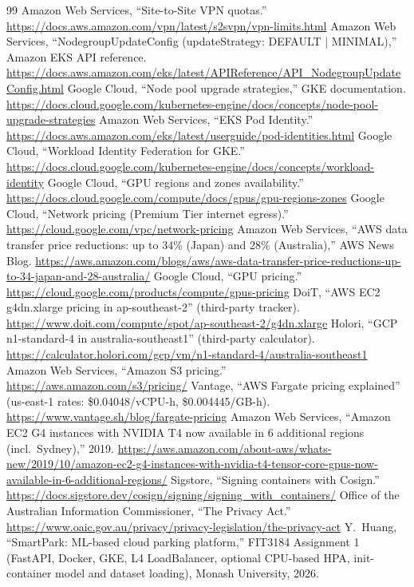 \documentclass[10pt,a4paper]{article}
\begin{document}
\begin{thebibliography}{99}
 Amazon Web Services, ``Site-to-Site VPN quotas.''
  \url{https://docs.aws.amazon.com/vpn/latest/s2svpn/vpn-limits.html}
 Amazon Web Services, ``NodegroupUpdateConfig (updateStrategy: DEFAULT | MINIMAL),'' Amazon EKS API reference.
  \url{https://docs.aws.amazon.com/eks/latest/APIReference/API_NodegroupUpdateConfig.html}
 Google Cloud, ``Node pool upgrade strategies,'' GKE documentation.
  \url{https://docs.cloud.google.com/kubernetes-engine/docs/concepts/node-pool-upgrade-strategies}
 Amazon Web Services, ``EKS Pod Identity.''
  \url{https://docs.aws.amazon.com/eks/latest/userguide/pod-identities.html}
 Google Cloud, ``Workload Identity Federation for GKE.''
  \url{https://docs.cloud.google.com/kubernetes-engine/docs/concepts/workload-identity}
 Google Cloud, ``GPU regions and zones availability.''
  \url{https://docs.cloud.google.com/compute/docs/gpus/gpu-regions-zones}
 Google Cloud, ``Network pricing (Premium Tier internet egress).''
  \url{https://cloud.google.com/vpc/network-pricing}
 Amazon Web Services, ``AWS data transfer price reductions: up to 34\% (Japan) and 28\% (Australia),'' AWS News Blog.
  \url{https://aws.amazon.com/blogs/aws/aws-data-transfer-price-reductions-up-to-34-japan-and-28-australia/}
 Google Cloud, ``GPU pricing.'' \url{https://cloud.google.com/products/compute/gpus-pricing}
 DoiT, ``AWS EC2 g4dn.xlarge pricing in ap-southeast-2'' (third-party tracker).
  \url{https://www.doit.com/compute/spot/ap-southeast-2/g4dn.xlarge}
 Holori, ``GCP n1-standard-4 in australia-southeast1'' (third-party calculator).
  \url{https://calculator.holori.com/gcp/vm/n1-standard-4/australia-southeast1}
 Amazon Web Services, ``Amazon S3 pricing.'' \url{https://aws.amazon.com/s3/pricing/}
 Vantage, ``AWS Fargate pricing explained'' (us-east-1 rates: \$0.04048/vCPU-h, \$0.004445/GB-h).
  \url{https://www.vantage.sh/blog/fargate-pricing}
 Amazon Web Services, ``Amazon EC2 G4 instances with NVIDIA T4 now available in 6 additional regions (incl.\ Sydney),'' 2019.
  \url{https://aws.amazon.com/about-aws/whats-new/2019/10/amazon-ec2-g4-instances-with-nvidia-t4-tensor-core-gpus-now-available-in-6-additional-regions/}
 Sigstore, ``Signing containers with Cosign.'' \url{https://docs.sigstore.dev/cosign/signing/signing_with_containers/}
 Office of the Australian Information Commissioner, ``The Privacy Act.''
  \url{https://www.oaic.gov.au/privacy/privacy-legislation/the-privacy-act}
 Y.~Huang, ``SmartPark: ML-based cloud parking platform,'' FIT3184 Assignment 1
  (FastAPI, Docker, GKE, L4 LoadBalancer, optional CPU-based HPA, init-container model and dataset loading),
  Monash University, 2026.
\end{thebibliography}
\end{document}
